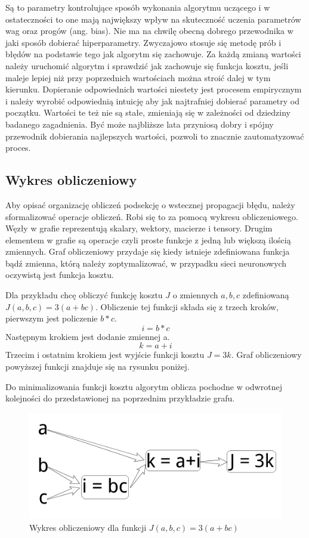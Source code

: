 \documentclass[12pt,a4paper,twoside,titlepage,openright]{book}
\begin{document}
Są to parametry kontrolujące sposób wykonania algorytmu uczącego i w ostateczności to one mają największy wpływ na skuteczność uczenia parametrów wag oraz progów (ang. bias). Nie ma na chwilę obecną dobrego przewodnika w jaki sposób dobierać hiperparametry. Zwyczajowo stosuje się metodę prób i błędów na podstawie tego jak algorytm się zachowuje. \cite{sitefastAI} Za każdą zmianą wartości należy uruchomić algorytm i sprawdzić jak zachowuje się funkcja kosztu, jeśli maleje lepiej niż przy poprzednich wartościach można stroić dalej w tym kierunku. Dopieranie odpowiednich wartości niestety jest procesem empirycznym i należy wyrobić odpowiednią intuicję aby jak najtrafniej dobierać parametry od początku. Wartości te też nie są stałe, zmieniają się w zależności od dziedziny badanego zagadnienia. Być może najbliższe lata przyniosą dobry i spójny przewodnik dobierania najlepszych wartości, pozwoli to znacznie zautomatyzować proces.

\subsection{Wykres obliczeniowy}
Aby opisać organizację obliczeń podsekcję o wstecznej propagacji błędu, należy sformalizować operacje obliczeń. Robi się to za pomocą wykresu obliczeniowego. Węzły w grafie reprezentują skalary, wektory, macierze i tensory. Drugim elementem w grafie są operacje czyli proste funkcje z jedną lub większą ilością zmiennych. Graf obliczeniowy przydaje się kiedy istnieje zdefiniowana funkcja bądź zmienna, którą należy zoptymalizować, w przypadku sieci neuronowych oczywistą jest funkcja kosztu.

Dla przykładu chcę obliczyć funkcję kosztu \(J\) o zmiennych \(a,b,c\) zdefiniowaną \(J(a,b,c) = 3(a+bc)\). Obliczenie tej funkcji składa się z trzech kroków, pierwszym jest policzenie \(b*c\).
$$i = b * c$$
Następnym krokiem jest dodanie zmiennej a.
$$k = a + i$$
Trzecim i ostatnim krokiem jest wyjście funkcji kosztu \(J = 3k\).
Graf obliczeniowy powyższej funkcji znajduje się na rysunku poniżej.

Do minimalizowania funkcji kosztu algorytm oblicza pochodne w odwrotnej kolejności do przedstawionej na poprzednim przykładzie grafu.

\begin{figure}[ht]
	\centering
			\includegraphics[resolution=100, scale=0.5]{ComputationGraph.png}
		\caption{Wykres obliczeniowy dla funkcji \(J(a,b,c) = 3(a+bc)\)}
\end{figure}
\end{document}
